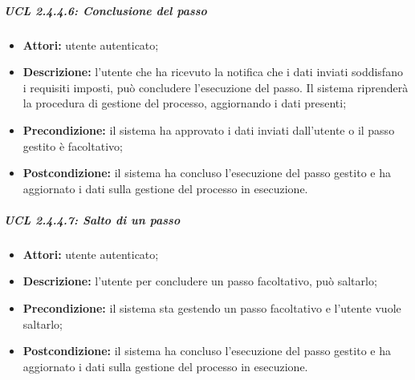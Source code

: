 \subparagraph{UCL 2.4.4.6: Conclusione del passo}
\begin{itemize}
\item \textbf{Attori:} utente autenticato;
\item \textbf{Descrizione:} l'utente che ha ricevuto la notifica che i dati inviati soddisfano i requisiti imposti, può concludere l'esecuzione del passo. Il sistema riprenderà la procedura di gestione del processo, aggiornando i dati presenti;
\item \textbf{Precondizione:} il sistema ha approvato i dati inviati dall'utente o il passo gestito è facoltativo;
\item \textbf{Postcondizione:} il sistema ha concluso l'esecuzione del passo gestito e ha aggiornato i dati sulla gestione del processo in esecuzione.
\end{itemize}

\subparagraph{UCL 2.4.4.7: Salto di un passo}
\begin{itemize}
\item \textbf{Attori:} utente autenticato;
\item \textbf{Descrizione:} l'utente per concludere un passo facoltativo, può saltarlo;
\item \textbf{Precondizione:} il sistema sta gestendo un passo facoltativo e l'utente vuole saltarlo;
\item \textbf{Postcondizione:} il sistema ha concluso l'esecuzione del passo gestito e ha aggiornato i dati sulla gestione del processo in esecuzione.
\end{itemize}


